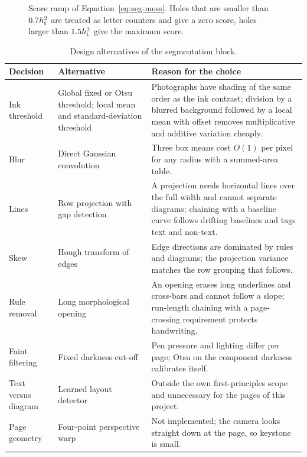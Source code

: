 \begin{figure}[h]
\centering
{}
\caption{Score ramp of Equation~\ref{eq:seg-mess}. Holes that are smaller than $0.7h_{\mathrm{t}}^2$ are treated as letter counters and give a zero score, holes larger than $1.5h_{\mathrm{t}}^2$ give the maximum score.}
\label{fig:seg-ramp}
\end{figure}

\begin{table}[h]
\centering
\fontsize{9.5}{11.5}\selectfont
\begin{tabularx}{\linewidth}{|p{2.6cm}|X|X|}
\hline
\textbf{Decision} & \textbf{Alternative} & \textbf{Reason for the choice} \\
\hline
Ink threshold & Global fixed or Otsu threshold; local mean and standard-deviation threshold & Photographs have shading of the same order as the ink contrast; division by a blurred background followed by a local mean with offset removes multiplicative and additive variation cheaply. \\
\hline
Blur & Direct Gaussian convolution & Three box means cost $O(1)$ per pixel for any radius with a summed-area table. \\
\hline
Lines & Row projection with gap detection & A projection needs horizontal lines over the full width and cannot separate diagrams; chaining with a baseline curve follows drifting baselines and tags text and non-text. \\
\hline
Skew & Hough transform of edges & Edge directions are dominated by rules and diagrams; the projection variance matches the row grouping that follows. \\
\hline
Rule removal & Long morphological opening & An opening erases long underlines and cross-bars and cannot follow a slope; run-length chaining with a page-crossing requirement protects handwriting. \\
\hline
Faint filtering & Fixed darkness cut-off & Pen pressure and lighting differ per page; Otsu on the component darkness calibrates itself. \\
\hline
Text versus diagram & Learned layout detector & Outside the own first-principles scope and unnecessary for the pages of this project. \\
\hline
Page geometry & Four-point perspective warp & Not implemented; the camera looks straight down at the page, so keystone is small. \\
\hline
\end{tabularx}
\caption{Design alternatives of the segmentation block.}
\label{tab:seg-alt}
\end{table}

